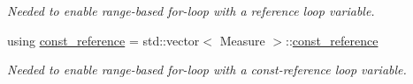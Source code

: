\begin{DoxyCompactItemize}
\begin{DoxyCompactList}\small\item\em Needed to enable range-\/based for-\/loop with a reference loop variable. \end{DoxyCompactList}\item 
using \hyperlink{structslb_1_1core_1_1sb_1_1MeasureSet_a1a3d223100e811626c1169500736808b}{const\+\_\+reference} = std\+::vector$<$ Measure $>$\+::\hyperlink{structslb_1_1core_1_1sb_1_1MeasureSet_a1a3d223100e811626c1169500736808b}{const\+\_\+reference}\hypertarget{structslb_1_1core_1_1sb_1_1MeasureSet_a1a3d223100e811626c1169500736808b}{}\label{structslb_1_1core_1_1sb_1_1MeasureSet_a1a3d223100e811626c1169500736808b}

\begin{DoxyCompactList}\small\item\em Needed to enable range-\/based for-\/loop with a const-\/reference loop variable. \end{DoxyCompactList}\end{DoxyCompactItemize}

